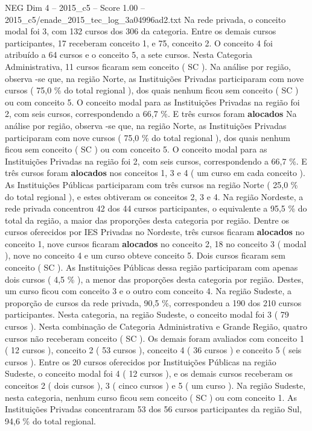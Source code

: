 \begin{textsample}{NEG Dim 4 – 2015\_c5 – Score 1.00 – 2015\_c5/enade\_2015\_tec\_log\_3a04996ad2.txt}
Na rede privada, o conceito modal foi 3, com 132 cursos dos 306 da categoria.
Entre os demais cursos participantes, 17 receberam conceito 1, e 75, conceito 2.
O conceito 4 foi atribuído a 64 cursos e o conceito 5, a sete cursos.
Nesta Categoria Administrativa, 11 cursos ficaram sem conceito ( SC ).
Na análise por região, observa -se que, na região Norte, as Instituições Privadas participaram com nove cursos ( 75,0 \% do total regional ), dos quais nenhum ficou sem conceito ( SC ) ou com conceito 5.
O conceito modal para as Instituições Privadas na região foi 2, com seis cursos, correspondendo a 66,7 \%.
E três cursos foram \textbf{alocados} Na análise por região, observa -se que, na região Norte, as Instituições Privadas participaram com nove cursos ( 75,0 \% do total regional ), dos quais nenhum ficou sem conceito ( SC ) ou com conceito 5.
O conceito modal para as Instituições Privadas na região foi 2, com seis cursos, correspondendo a 66,7 \%.
E três cursos foram \textbf{alocados} nos conceitos 1, 3 e 4 ( um curso em cada conceito ).
As Instituições Públicas participaram com três cursos na região Norte ( 25,0 \% do total regional ), e estes obtiveram os conceitos 2, 3 e 4.
Na região Nordeste, a rede privada concentrou 42 dos 44 cursos participantes, o equivalente a 95,5 \% do total da região, a maior das proporções desta categoria por região.
Dentre os cursos oferecidos por IES Privadas no Nordeste, três cursos ficaram \textbf{alocados} no conceito 1, nove cursos ficaram \textbf{alocados} no conceito 2, 18 no conceito 3 ( modal ), nove no conceito 4 e um curso obteve conceito 5.
Dois cursos ficaram sem conceito ( SC ).
As Instituições Públicas dessa região participaram com apenas dois cursos ( 4,5 \% ), a menor das proporções desta categoria por região.
Destes, um curso ficou com conceito 3 e o outro com conceito 4.
Na região Sudeste, a proporção de cursos da rede privada, 90,5 \%, correspondeu a 190 dos 210 cursos participantes.
Nesta categoria, na região Sudeste, o conceito modal foi 3 ( 79 cursos ).
Nesta combinação de Categoria Administrativa e Grande Região, quatro cursos não receberam conceito ( SC ).
Os demais foram avaliados com conceito 1 ( 12 cursos ), conceito 2 ( 53 cursos ), conceito 4 ( 36 cursos ) e conceito 5 ( seis cursos ).
Entre os 20 cursos oferecidos por Instituições Públicas na região Sudeste, o conceito modal foi 4 ( 12 cursos ), e os demais cursos receberam os conceitos 2 ( dois cursos ), 3 ( cinco cursos ) e 5 ( um curso ).
Na região Sudeste, nesta categoria, nenhum curso ficou sem conceito ( SC ) ou com conceito 1.
As Instituições Privadas concentraram 53 dos 56 cursos participantes da região Sul, 94,6 \% do total regional.

\end{textsample}
